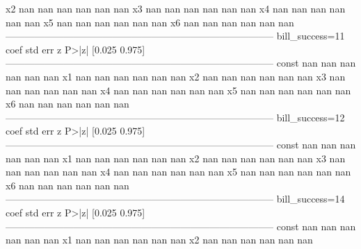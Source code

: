 \begin{pyprint}
x2                     nan        nan        nan        nan         nan         nan
x3                     nan        nan        nan        nan         nan         nan
x4                     nan        nan        nan        nan         nan         nan
x5                     nan        nan        nan        nan         nan         nan
x6                     nan        nan        nan        nan         nan         nan
-----------------------------------------------------------------------------------
bill_success=11       coef    std err          z      P>|z|      [0.025      0.975]
-----------------------------------------------------------------------------------
const                  nan        nan        nan        nan         nan         nan
x1                     nan        nan        nan        nan         nan         nan
x2                     nan        nan        nan        nan         nan         nan
x3                     nan        nan        nan        nan         nan         nan
x4                     nan        nan        nan        nan         nan         nan
x5                     nan        nan        nan        nan         nan         nan
x6                     nan        nan        nan        nan         nan         nan
-----------------------------------------------------------------------------------
bill_success=12       coef    std err          z      P>|z|      [0.025      0.975]
-----------------------------------------------------------------------------------
const                  nan        nan        nan        nan         nan         nan
x1                     nan        nan        nan        nan         nan         nan
x2                     nan        nan        nan        nan         nan         nan
x3                     nan        nan        nan        nan         nan         nan
x4                     nan        nan        nan        nan         nan         nan
x5                     nan        nan        nan        nan         nan         nan
x6                     nan        nan        nan        nan         nan         nan
-----------------------------------------------------------------------------------
bill_success=14       coef    std err          z      P>|z|      [0.025      0.975]
-----------------------------------------------------------------------------------
const                  nan        nan        nan        nan         nan         nan
x1                     nan        nan        nan        nan         nan         nan
x2                     nan        nan        nan        nan         nan         nan

\end{pyprint}
